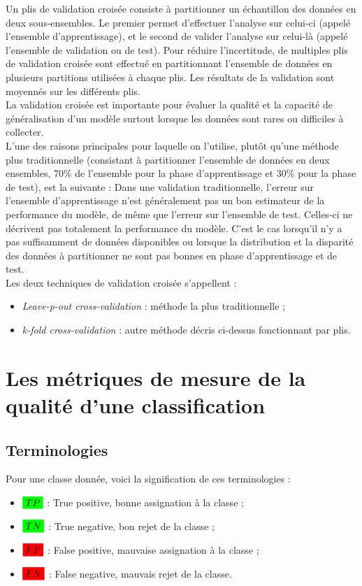     Un plis de validation croisée consiste à partitionner un échantillon des données en deux sous-ensembles. Le premier permet d'effectuer l'analyse sur celui-ci (appelé l'ensemble d'apprentissage), et le second de valider l'analyse sur celui-là (appelé l'ensemble de validation ou de test). Pour réduire l'incertitude, de multiples plis de validation croisée sont effectué en partitionnant l'ensemble de données en plusieurs partitions utilisées à chaque plis. Les résultats de la validation sont moyennés sur les différents plis.\\

    La validation croisée est importante pour évaluer la qualité et la capacité de généralisation d'un modèle surtout lorsque les données sont rares ou difficiles à collecter.\\

    L'une des raisons principales pour laquelle on l'utilise, plutôt qu'une méthode plus traditionnelle (consistant à partitionner l'ensemble de données en deux ensembles, 70\% de l'ensemble pour la phase d'apprentissage et 30\% pour la phase de test), est la suivante : Dans une validation traditionnelle, l'erreur sur l'ensemble d'apprentissage n'est généralement pas un bon estimateur de la performance du modèle, de même que l'erreur sur l'ensemble de test. Celles-ci ne décrivent pas totalement la performance du modèle. C'est le cas lorsqu'il n'y a pas suffisamment de données disponibles ou lorsque la distribution et la disparité des données à partitionner ne sont pas bonnes en phase d'apprentissage et de test.\\

    Les deux techniques de validation croisée s'appellent :
    \begin{itemize}
        \item \textit{Leave-p-out cross-validation} : méthode la plus traditionnelle ;
        \item \textit{k-fold cross-validation} : autre méthode décris ci-dessus fonctionnant par plis.
    \end{itemize}

\section{Les métriques de mesure de la qualité d'une classification}
    \subsection{Terminologies}
        Pour une classe donnée, voici la signification de ces terminologies :
        \begin{itemize}
            \item $\highlight[green]{TP}$ : True positive, bonne assignation à la classe ;
            \item $\highlight[green]{TN}$ : True negative, bon rejet de la classe ;
            \item $\highlight[red]{FP}$ : False positive, mauvaise assignation à la classe ;
            \item $\highlight[red]{FN}$ : False negative, mauvais rejet de la classe.
        \end{itemize}

